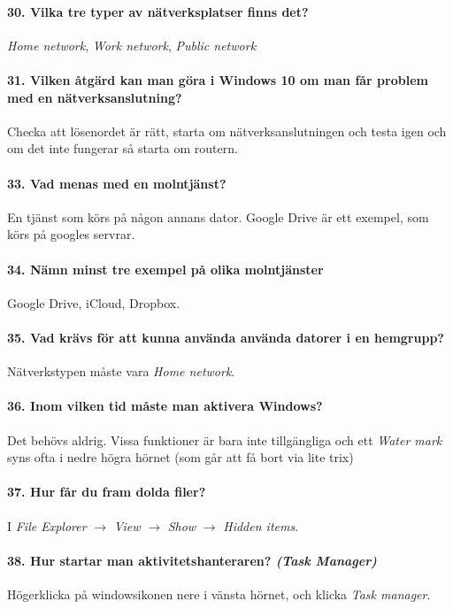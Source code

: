 \paragraph{30. Vilka tre typer av nätverksplatser finns det?}
\textit{Home network}, \textit{Work network}, \textit{Public network}

\paragraph{31. Vilken åtgärd kan man göra i Windows 10 om man får problem med en nätverksanslutning?}
Checka att lösenordet är rätt, starta om nätverksanslutningen och testa igen och om det inte fungerar så starta om routern.

\paragraph{33. Vad menas med en molntjänst?}
En tjänst som körs på någon annans dator. Google Drive är ett exempel, som körs på googles servrar.

\paragraph{34. Nämn minst tre exempel på olika molntjänster}
Google Drive, iCloud, Dropbox.

\paragraph{35. Vad krävs för att kunna använda använda datorer i en hemgrupp?}
Nätverkstypen måste vara \textit{Home network}.

\paragraph{36. Inom vilken tid måste man aktivera Windows?}
Det behövs aldrig. Vissa funktioner är bara inte tillgängliga och ett \textit{Water mark} syns ofta i nedre högra hörnet (som går att få bort via lite trix)

\paragraph{37. Hur får du fram dolda filer?}
I \textit{File Explorer} $\rightarrow$ \textit{View} $\rightarrow$ \textit{Show} $\rightarrow$ \textit{Hidden items}.

\paragraph{38. Hur startar man aktivitetshanteraren? \textit{(Task Manager)}}
Högerklicka på windowsikonen nere i vänsta hörnet, och klicka \textit{Task manager}.

